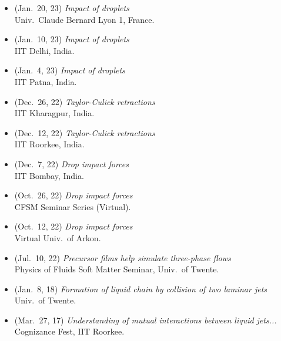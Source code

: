 \documentclass[10pt,a4paper,colorlinks,linkcolor=blue,urlcolor=blue,citecolor=blue]{moderncv}
\begin{document}
\begin{itemize}[leftmargin=1.5em]
\item[\textbullet] (Jan.~20, 23) \emph{Impact of droplets} \\
  Univ.~Claude Bernard Lyon 1, France.
\item[\textbullet] (Jan.~10, 23) \emph{Impact of droplets} \\
  IIT Delhi, India.
\item[\textbullet] (Jan.~4, 23) \emph{Impact of droplets} \\
  IIT Patna, India.
\item[\textbullet] (Dec.~26, 22) \emph{Taylor-Culick retractions} \\
  IIT Kharagpur, India.
\item[\textbullet] (Dec.~12, 22) \emph{Taylor-Culick retractions} \\
  IIT Roorkee, India.
\item[\textbullet] (Dec.~7, 22) \emph{Drop impact forces} \\
  IIT Bombay, India.
\item[\textbullet] (Oct.~26, 22) \emph{Drop impact forces} \\
  CFSM Seminar Series (Virtual). \href{https://www.youtube.com/live/enTMAucwUDs?si=Dm-IJ3A0o7AhMc2T}{\color{red}\faYoutube}
\item[\textbullet] (Oct.~12, 22) \emph{Drop impact forces} \\
  Virtual Univ.~of Arkon.
\item[\textbullet] (Jul.~10, 22) \emph{Precursor films help simulate three-phase flows} \\
  Physics of Fluids Soft Matter Seminar, Univ.~of Twente. \href{https://youtu.be/ozrnYe8u1HA?si=DA4JIFjNozmPsQuE}{\color{red}\faYoutube}
\item[\textbullet] (Jan.~8, 18) \emph{Formation of liquid chain by collision of two laminar jets} \\
  Univ.~of Twente.
\item[\textbullet] (Mar.~27, 17) \emph{Understanding of mutual interactions between liquid jets...} \\
  Cognizance Fest, IIT Roorkee.
\end{itemize}
\end{document}
